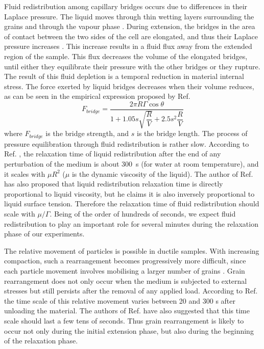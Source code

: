 Fluid redistribution among capillary bridges occurs due to differences in their Laplace pressure. The liquid moves through thin wetting layers surrounding the grains and through the vapour phase \cite{Herminghaus2005,Kohonen1999,Seeman2001}. During extension, the bridges in the area of contact between the two sides of the cell are elongated, and thus their Laplace pressure increases \cite{Lambert2008,Lian2016,Lian1993}. This increase results in a fluid flux away from the extended region of the sample. This flux decreases the volume of the elongated bridges, until either they equilibrate their pressure with the other bridges or they rupture. The result of this fluid depletion is a temporal reduction in material internal stress. The force exerted by liquid bridges decreases when their volume reduces, as can be seen in the empirical expression proposed by Ref. \cite{Willett2000}
\begin{equation}\label{willett}
\displaystyle F_{bridge}=\frac{2\pi R\Gamma\cos\theta}{1+1.05s\sqrt{\dfrac{R}{V}}+2.5s^2\dfrac{R}{V}}
\end{equation}
where $F_{bridge}$ is the bridge strength, and $s$ is the bridge length. The process of pressure equilibration through fluid redistribution is rather slow. According to Ref. \cite{Herminghaus2005}, the relaxation time of liquid redistribution after the end of any perturbation of the medium is about 300~\si{s} (for water at room temperature), and it scales with $\mu R^2$ ($\mu$ is the dynamic viscosity of the liquid). The author of Ref. \cite{Scheel2009} has also proposed that liquid redistribution relaxation time is directly proportional to liquid viscosity, but he claims it is also inversely proportional to liquid surface tension. Therefore the relaxation time of fluid redistribution should scale with $\mu/\Gamma$. Being of the order of hundreds of seconds, we expect fluid redistribution to play an important role for several minutes during the relaxation phase of our experiments.

The relative movement of particles is possible in ductile samples. With increasing compaction, such a rearrangement becomes progressively more difficult, since each particle movement involves mobilising a larger number of grains \cite{Hartley2003,Utter2004}. Grain rearrangement does not only occur when the medium is subjected to external stresses but still persists after the removal of any applied load. According to Ref. \cite{Hartley2003} the time scale of this relative movement varies between 20 and 300 s after unloading the material. The authors of Ref. \cite{Utter2004} have also suggested that this time scale should last a few tens of seconds. Thus grain rearrangement is likely to occur not only during the initial extension phase, but also during the beginning of the relaxation phase.

